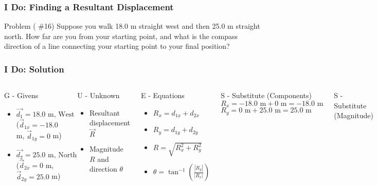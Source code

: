 \documentclass{beamer}
\begin{document}
\begin{frame}
\frametitle{I Do: Finding a Resultant Displacement}
\begin{block}{Problem ( \#16)}
Suppose you walk 18.0 m straight west and then 25.0 m straight north. How far are you from your starting point, and what is the compass direction of a line connecting your starting point to your final position?
\end{block}
\end{frame}

\begin{frame}[fragile]
\frametitle{I Do: Solution}
\begin{columns}
\begin{block}{G - Givens}
\begin{itemize}
    \item $\vec{d_1} = 18.0 \text{ m, West}$ \\ ($\vec{d}_{1x} = -18.0$ m, $\vec{d}_{1y} = 0$ m)
    \item $\vec{d_2} = 25.0 \text{ m, North}$ \\ ($\vec{d}_{2x} = 0$ m, $\vec{d}_{2y} = 25.0$ m)
\end{itemize}
\end{block}
\pause
\begin{block}{U - Unknown}
\begin{itemize}
    \item Resultant displacement $\vec{R}$
    \item Magnitude $R$ and direction $\theta$
\end{itemize}
\end{block}
\pause
\begin{block}{E - Equations}
\begin{itemize}
    \item $R_x = d_{1x} + d_{2x}$
    \item $R_y = d_{1y} + d_{2y}$
    \item $R = \sqrt{R_x^2 + R_y^2}$
    \item $\theta = \tan^{-1}\left(\frac{|R_y|}{|R_x|}\right)$
\end{itemize}
\end{block}
\begin{block}{S - Substitute (Components)}
$R_x = -18.0 \text{ m} + 0 \text{ m} = -18.0 \text{ m}$
$R_y = 0 \text{ m} + 25.0 \text{ m} = 25.0 \text{ m}$
\end{block}
\pause
\begin{block}{S - Substitute (Magnitude)}

\end{block}
\end{columns}
\end{frame}
\end{document}

